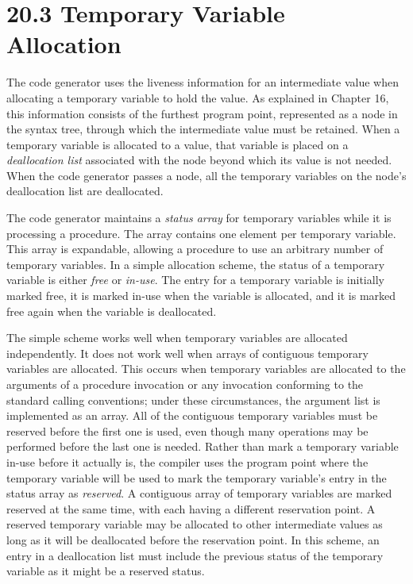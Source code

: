 \section[20.3 Temporary Variable Allocation]{20.3 Temporary Variable Allocation}

The code generator uses the liveness information for an intermediate
value when allocating a temporary variable to hold the value. As
explained in Chapter 16, this information consists of the furthest
program point, represented as a node in the syntax tree, through which
the intermediate value must be retained. When a temporary variable is
allocated to a value, that variable is placed on a
\textit{deallocation list} associated with the node beyond which its
value is not needed. When the code generator passes a node, all the
temporary variables on the node's deallocation list are deallocated.

The code generator maintains a \textit{status array} for temporary
variables while it is processing a procedure. The array contains one
element per temporary variable. This array is expandable, allowing a
procedure to use an arbitrary number of temporary variables. In a
simple allocation scheme, the status of a temporary variable is either
\textit{free} or \textit{in-use}. The entry for a temporary variable
is initially marked free, it is marked in-use when the variable is
allocated, and it is marked free again when the variable is
deallocated.

The simple scheme works well when temporary variables are allocated
independently. It does not work well when arrays of contiguous
temporary variables are allocated. This occurs when temporary
variables are allocated to the arguments of a procedure invocation or
any invocation conforming to the standard calling conventions; under
these circumstances, the argument list is implemented as an array. All
of the contiguous temporary variables must be reserved before the
first one is used, even though many operations may be performed before
the last one is needed. Rather than mark a temporary variable in-use
before it actually is, the compiler uses the program point where the
temporary variable will be used to mark the temporary variable's entry
in the status array as \textit{reserved}. A contiguous array of
temporary variables are marked reserved at the same time, with each
having a different reservation point. A reserved temporary variable
may be allocated to other intermediate values as long as it will be
deallocated before the reservation point. In this scheme, an entry in
a deallocation list must include the previous status of the temporary
variable as it might be a reserved status.

